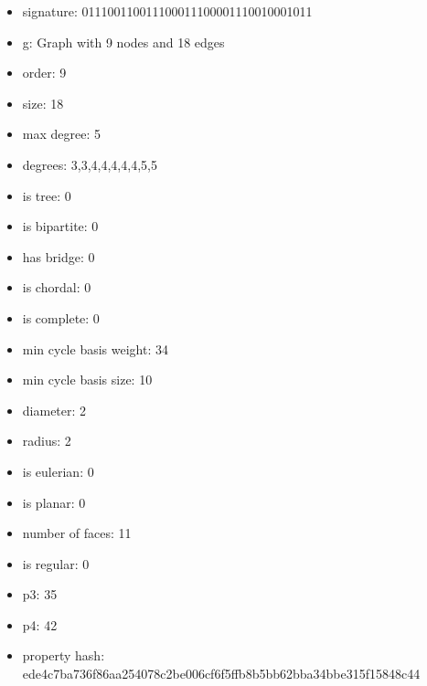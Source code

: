 \newpage
\begin{figure}
\end{figure}
\begin{itemize}
\item signature: 011100110011100011100001110010001011
\item g: Graph with 9 nodes and 18 edges
\item order: 9
\item size: 18
\item max degree: 5
\item degrees: 3,3,4,4,4,4,4,5,5
\item is tree: 0
\item is bipartite: 0
\item has bridge: 0
\item is chordal: 0
\item is complete: 0
\item min cycle basis weight: 34
\item min cycle basis size: 10
\item diameter: 2
\item radius: 2
\item is eulerian: 0
\item is planar: 0
\item number of faces: 11
\item is regular: 0
\item p3: 35
\item p4: 42
\item property hash: ede4c7ba736f86aa254078c2be006cf6f5ffb8b5bb62bba34bbe315f15848c44
\end{itemize}
